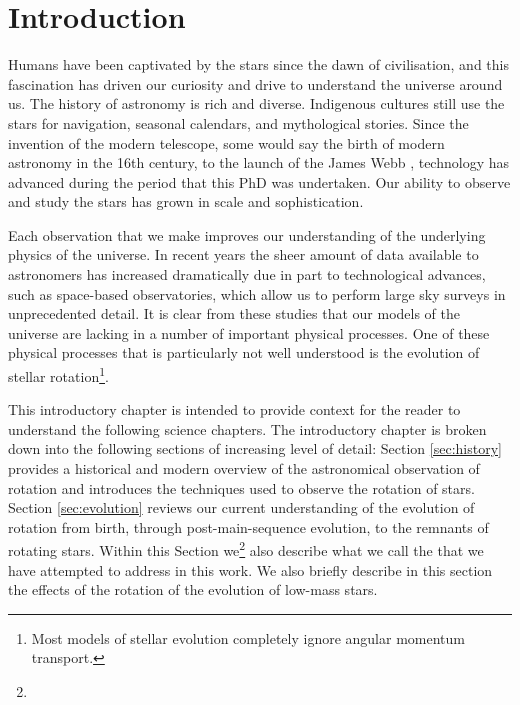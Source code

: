 
\newcommand\dive{\textmd{div}}
\newcommand\der{\textmd{d}}
\newcommand\rper{$R_{\rm{per}}$}

\chapter{Introduction}
\label{chap:intro}

Humans have been captivated by the stars since the dawn of civilisation, and this fascination has driven our curiosity and drive to understand the universe around us. 
The history of astronomy is rich and diverse. 
Indigenous cultures still use the stars for navigation, seasonal calendars, and mythological stories. 
Since the invention of the modern telescope, some would say the birth of modern astronomy in the 16th century, to the launch of the James Webb , technology has advanced during the period that this PhD was undertaken. 
Our ability to observe and study the stars has grown in scale and sophistication. 

Each observation that we make improves our understanding of the underlying physics of the universe. 
In recent years the sheer amount of data available to astronomers has increased dramatically due in part to technological advances, such as space-based observatories, which allow us to perform large sky surveys in unprecedented detail. 
It is clear from these studies that our models of the universe are lacking in a number of important physical processes. 
One of these physical processes that is particularly not well understood is the evolution of stellar rotation\footnote{Most models of stellar evolution completely ignore angular momentum transport.}.

This introductory chapter is intended to provide context for the reader to understand the following science chapters. 
The introductory chapter is broken down into the following sections of increasing level of detail:
Section \ref{sec:history} provides a historical and modern overview of the astronomical observation of rotation and introduces the techniques used to observe the rotation of stars.
Section \ref{sec:evolution} reviews our current understanding of the evolution of rotation from birth, through post-main-sequence evolution, to the remnants of rotating stars. Within this Section we\footnote{} also describe what we call the  that we have attempted to address in this work. We also briefly describe in this section the effects of the rotation of the evolution of low-mass stars.

